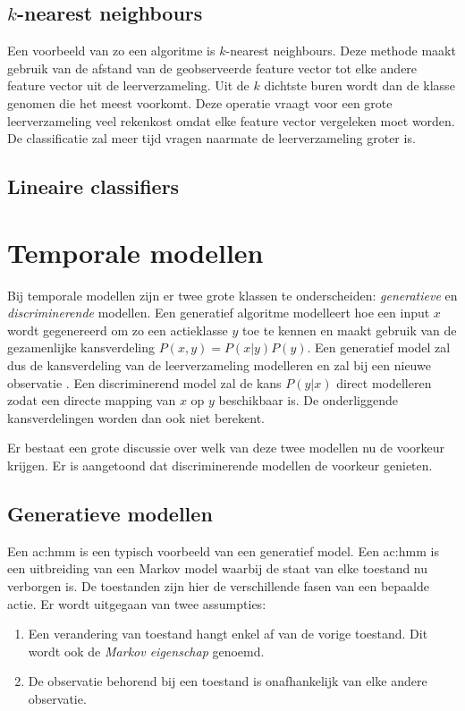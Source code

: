\subsection{$k$-nearest neighbours}
Een voorbeeld van zo een algoritme is $k$-nearest neighbours. Deze methode maakt gebruik van de afstand van de geobserveerde feature vector tot elke andere feature vector uit de leerverzameling. Uit de $k$ dichtste buren wordt dan de klasse genomen die het meest voorkomt. Deze operatie vraagt voor een grote leerverzameling veel rekenkost omdat elke feature vector vergeleken moet worden. De classificatie zal meer tijd vragen naarmate de leerverzameling groter is. 

\subsection{Lineaire classifiers}


\section{Temporale modellen}
\label{subsec:temporale_modellen}
Bij temporale modellen zijn er twee grote klassen te onderscheiden: \textit{generatieve} en \textit{discriminerende} modellen. Een generatief algoritme modelleert hoe een input $x$ wordt gegenereerd om zo een actieklasse $y$ toe te kennen en maakt gebruik van de gezamenlijke kansverdeling $P(x, y) = P(x|y)P(y)$. Een generatief model zal dus de kansverdeling van de leerverzameling modelleren en zal bij een nieuwe observatie . Een discriminerend model zal de kans $P(y|x)$ direct modelleren zodat een directe mapping van $x$ op $y$ beschikbaar is. De onderliggende kansverdelingen worden dan ook niet berekent.
 
Er bestaat een grote discussie over welk van deze twee modellen nu de voorkeur krijgen. Er is aangetoond \cite{Andrew2002} dat discriminerende modellen de voorkeur genieten.

\subsection{Generatieve modellen}

Een \gls{ac:hmm} is een typisch voorbeeld van een generatief model. Een \gls{ac:hmm} is een uitbreiding van een Markov model waarbij de staat van elke toestand nu verborgen is. De toestanden zijn hier de verschillende fasen van een bepaalde actie. Er wordt uitgegaan van twee assumpties:
\begin{enumerate}
	\item Een verandering van toestand hangt enkel af van de vorige toestand. Dit wordt ook de \textit{Markov eigenschap} genoemd.
	\item De observatie behorend bij een toestand is onafhankelijk van elke andere observatie.
\end{enumerate}

